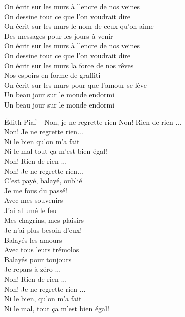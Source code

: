 \documentclass{novel}
\begin{document}
\begin{multicols}{2}
On écrit sur les murs à l'encre de nos veines \\
On dessine tout ce que l'on voudrait dire \\
On écrit sur les murs le nom de ceux qu'on aime \\
Des messages pour les jours à venir \\
On écrit sur les murs à l'encre de nos veines \\
On dessine tout ce que l'on voudrait dire \\
On écrit sur les murs la force de nos rêves \\
Nos espoirs en forme de graffiti \\
On écrit sur les murs pour que l'amour se lève \\
Un beau jour sur le monde endormi \\
Un beau jour sur le monde endormi \\
\end{multicols}

\newpage
\normalsize
\h*{Edith Piaf – Non, je ne regrette rien}
Non! Rien de rien ... \\
Non! Je ne regrette rien... \\
Ni le bien qu'on m'a fait \\
Ni le mal tout ça m'est bien égal! \\

Non! Rien de rien ... \\
Non! Je ne regrette rien... \\
C'est payé, balayé, oublié \\
Je me fous du passé! \\

Avec mes souvenirs \\
J'ai allumé le feu \\
Mes chagrins, mes plaisirs \\
Je n'ai plus besoin d'eux! \\

Balayés les amours \\
Avec tous leurs trémolos \\
Balayés pour toujours \\
Je repars à zéro ... \\

Non! Rien de rien ... \\
Non! Je ne regrette rien ... \\
Ni le bien, qu'on m'a fait \\
Ni le mal, tout ça m'est bien égal! \\
\end{document}
